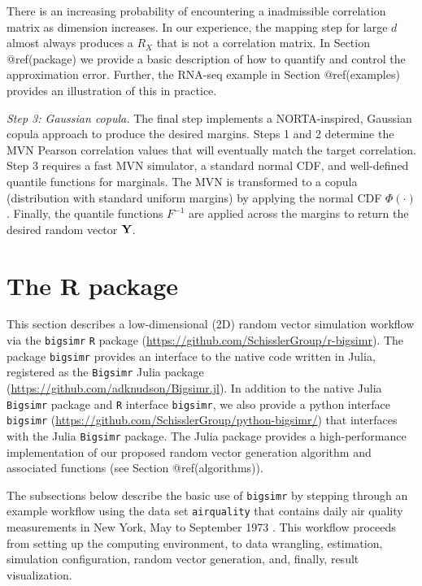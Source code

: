 \documentclass[
]{jss}
\begin{document}
There is an increasing probability of encountering a inadmissible
correlation matrix as dimension increases. In our experience, the
mapping step for large \(d\) almost always produces a \(R_X\) that is
not a correlation matrix. In Section @ref(package) we provide a basic
description of how to quantify and control the approximation error.
Further, the RNA-seq example in Section @ref(examples) provides an
illustration of this in practice.

\emph{Step 3: Gaussian copula.} The final step implements a
NORTA-inspired, Gaussian copula approach to produce the desired margins.
Steps 1 and 2 determine the MVN Pearson correlation values that will
eventually match the target correlation. Step 3 requires a fast MVN
simulator, a standard normal CDF, and well-defined quantile functions
for marginals. The MVN is transformed to a copula (distribution with
standard uniform margins) by applying the normal CDF \(\Phi(\cdot)\).
Finally, the quantile functions \(F^{-1}\) are applied across the
margins to return the desired random vector \({\bf Y}\).

\section[bigsimr-pkg]{The  R package}\label{package}

This section describes a low-dimensional (2D) random vector simulation
workflow via the \texttt{bigsimr} \texttt{R} package
(\url{https://github.com/SchisslerGroup/r-bigsimr}). The package
\texttt{bigsimr} provides an interface to the native code written in
Julia, registered as the \texttt{Bigsimr} Julia package
(\url{https://github.com/adknudson/Bigsimr.jl}). In addition to the
native Julia \texttt{Bigsimr} package and \texttt{R} interface
\texttt{bigsimr}, we also provide a python interface \texttt{bigsimr}
(\url{https://github.com/SchisslerGroup/python-bigsimr/}) that
interfaces with the Julia \texttt{Bigsimr} package. The Julia package
provides a high-performance implementation of our proposed random vector
generation algorithm and associated functions (see Section
@ref(algorithms)).

The subsections below describe the basic use of \texttt{bigsimr} by
stepping through an example workflow using the data set
\texttt{airquality} that contains daily air quality measurements in New
York, May to September 1973 \citep{Chambers1983}. This workflow proceeds
from setting up the computing environment, to data wrangling,
estimation, simulation configuration, random vector generation, and,
finally, result visualization.
\end{document}

